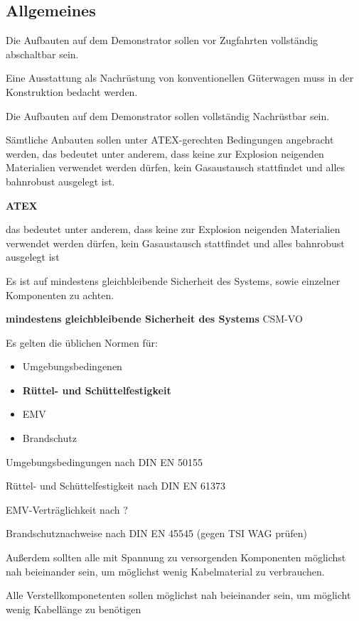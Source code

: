 \subsection{Allgemeines}
\begin{feat}
Die Aufbauten auf dem Demonstrator sollen vor Zugfahrten vollständig abschaltbar sein.
\end{feat}
Eine Ausstattung als Nachrüstung von konventionellen Güterwagen muss in der Konstruktion bedacht werden.\par
\begin{feat}
Die Aufbauten auf dem Demonstrator sollen vollständig Nachrüstbar sein.
\end{feat}
Sämtliche Anbauten sollen unter ATEX-gerechten Bedingungen angebracht werden, das bedeutet unter anderem, dass keine zur Explosion neigenden Materialien verwendet werden dürfen, kein Gasaustausch stattfindet und alles bahnrobust ausgelegt ist.
\begin{feat}
\textbf{ATEX}
\end{feat}
\begin{rem}
das bedeutet unter anderem, dass keine zur Explosion neigenden Materialien verwendet werden dürfen, kein Gasaustausch stattfindet und alles bahnrobust ausgelegt ist
\end{rem}
Es ist auf mindestens gleichbleibende  Sicherheit des Systems, sowie einzelner Komponenten zu achten.
\begin{feat}
\textbf{mindestens gleichbleibende Sicherheit des Systems} CSM-VO
\end{feat}
Es gelten die üblichen Normen für:
\begin{itemize}
    \item Umgebungsbedingenen
    \item \textbf{Rüttel- und Schüttelfestigkeit}
    \item EMV
    \item Brandschutz
\end{itemize}
\begin{feat}
Umgebungsbedingungen nach \acrshort{DIN} \acrshort{EN} 50155
\end{feat}
\begin{feat}
Rüttel- und Schüttelfestigkeit nach \acrshort{DIN} \acrshort{EN} 61373
\end{feat}
\begin{feat}
EMV-Verträglichkeit nach ?
\end{feat}
\begin{feat}
Brandschutznachweise nach \acrshort{DIN} \acrshort{EN} 45545 (gegen TSI WAG prüfen)
\end{feat}
Außerdem sollten alle mit Spannung zu versorgenden Komponenten möglichst nah beieinander sein, um möglichst wenig Kabelmaterial zu verbrauchen.
\begin{feat}
Alle Verstellkomponetenten sollen möglichst nah beieinander sein, um möglicht wenig Kabellänge zu benötigen
\end{feat}

